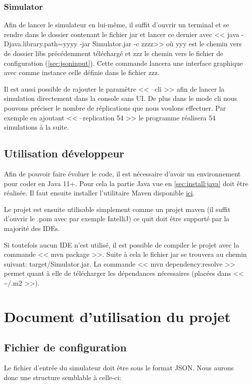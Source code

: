 \documentclass[final]{polytech/polytech}
\begin{document}
		\subsection{Simulator}
			Afin de lancer le simulateur en lui-même, il suffit d'ouvrir un terminal et se rendre dans le dossier contenant le fichier jar et lancer ce dernier avec << java -Djava.library.path=yyyy -jar Simulator.jar -c zzzz>> où yyy est le chemin vers de dossier libs précédemment téléchargé et zzz le chemin vers le fichier de configuration (\autoref{sec:jsoninput}).
			Cette commande lancera une interface graphique avec comme instance celle définie dans le fichier zzz.
			
			Il est aussi possible de rajouter le paramètre << --cli >> afin de lancer la simulation directement dans la console sans UI.
			De plus dans le mode cli nous pouvons préciser le nombre de réplications que nous voulons effectuer. Par exemple en ajoutant << --replication 54 >> le programme réalisera 54 simulations à la suite. 
	\section{Utilisation développeur}
		Afin de pouvoir faire évoluer le code, il est nécessaire d'avoir un environnement pour coder en Java 11+.
		Pour cela la partie Java vue en \autoref{sec:install:java} doit être réalisée.
		Il faut ensuite installer l'utilitaire Maven disponible \href{https://maven.apache.org/download.cgi}{ici}.
		
		Le projet est ensuite utilisable simplement comme un projet maven (il suffit d'ouvrir le .pom avec par exemple IntelliJ) ce quit doit être supporté par la majorité des IDEs.
		
		Si toutefois aucun IDE n'est utilisé, il est possible de compiler le projet avec la commande << mvn package >>.
		Suite à cela le fichier jar se trouvera au chemin suivant: target/Simulator.jar.
		La commande << mvn dependency:resolve >> permet quant à elle de télécharger les dépendances nécessaires (placées dans << \textasciitilde/.m2 >>).
 

\chapter{Document d'utilisation du projet}
	\section{Fichier de configuration\label{sec:jsoninput}}
		Le fichier d'entrée du simulateur doit être sous le format JSON.
		Nous aurons donc une structure semblable à celle-ci:
		
\end{document}
